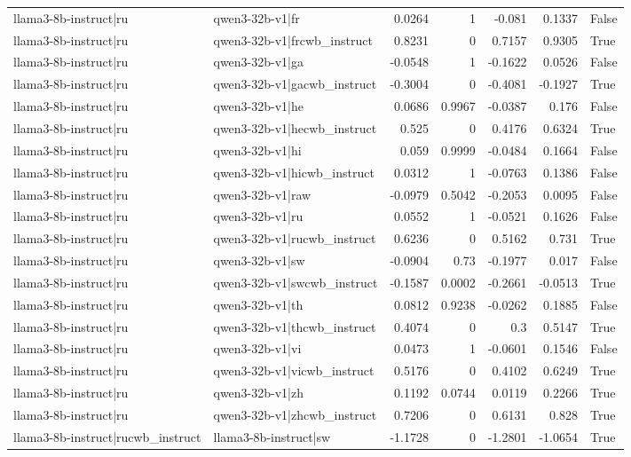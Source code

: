 \begin{table}
\begin{tabular}{l l r r r r l}
llama3-8b-instruct|ru & qwen3-32b-v1|fr & 0.0264 & 1 & -0.081 & 0.1337 & False \\
llama3-8b-instruct|ru & qwen3-32b-v1|frcwb_instruct & 0.8231 & 0 & 0.7157 & 0.9305 & True \\
llama3-8b-instruct|ru & qwen3-32b-v1|ga & -0.0548 & 1 & -0.1622 & 0.0526 & False \\
llama3-8b-instruct|ru & qwen3-32b-v1|gacwb_instruct & -0.3004 & 0 & -0.4081 & -0.1927 & True \\
llama3-8b-instruct|ru & qwen3-32b-v1|he & 0.0686 & 0.9967 & -0.0387 & 0.176 & False \\
llama3-8b-instruct|ru & qwen3-32b-v1|hecwb_instruct & 0.525 & 0 & 0.4176 & 0.6324 & True \\
llama3-8b-instruct|ru & qwen3-32b-v1|hi & 0.059 & 0.9999 & -0.0484 & 0.1664 & False \\
llama3-8b-instruct|ru & qwen3-32b-v1|hicwb_instruct & 0.0312 & 1 & -0.0763 & 0.1386 & False \\
llama3-8b-instruct|ru & qwen3-32b-v1|raw & -0.0979 & 0.5042 & -0.2053 & 0.0095 & False \\
llama3-8b-instruct|ru & qwen3-32b-v1|ru & 0.0552 & 1 & -0.0521 & 0.1626 & False \\
llama3-8b-instruct|ru & qwen3-32b-v1|rucwb_instruct & 0.6236 & 0 & 0.5162 & 0.731 & True \\
llama3-8b-instruct|ru & qwen3-32b-v1|sw & -0.0904 & 0.73 & -0.1977 & 0.017 & False \\
llama3-8b-instruct|ru & qwen3-32b-v1|swcwb_instruct & -0.1587 & 0.0002 & -0.2661 & -0.0513 & True \\
llama3-8b-instruct|ru & qwen3-32b-v1|th & 0.0812 & 0.9238 & -0.0262 & 0.1885 & False \\
llama3-8b-instruct|ru & qwen3-32b-v1|thcwb_instruct & 0.4074 & 0 & 0.3 & 0.5147 & True \\
llama3-8b-instruct|ru & qwen3-32b-v1|vi & 0.0473 & 1 & -0.0601 & 0.1546 & False \\
llama3-8b-instruct|ru & qwen3-32b-v1|vicwb_instruct & 0.5176 & 0 & 0.4102 & 0.6249 & True \\
llama3-8b-instruct|ru & qwen3-32b-v1|zh & 0.1192 & 0.0744 & 0.0119 & 0.2266 & True \\
llama3-8b-instruct|ru & qwen3-32b-v1|zhcwb_instruct & 0.7206 & 0 & 0.6131 & 0.828 & True \\
llama3-8b-instruct|rucwb_instruct & llama3-8b-instruct|sw & -1.1728 & 0 & -1.2801 & -1.0654 & True \\

\end{tabular}
\end{table}
